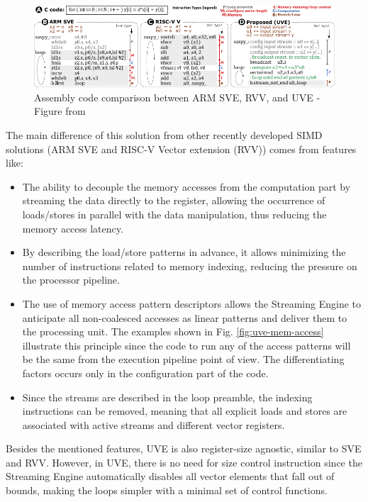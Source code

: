 \begin{figure}[H]
    \centering
    \includegraphics[width=.9\linewidth]{images/UVE-Comparison.pdf}
    \caption{Assembly code comparison between ARM SVE, RVV, and UVE - Figure from \cite{uve-paper}}
    \label{fig:uve-comparison}
\end{figure}

The main difference of this solution from other recently developed SIMD solutions (ARM SVE and RISC-V Vector extension (RVV)) comes from features like:
\begin{itemize}
\item[]   The ability to decouple the memory accesses from the computation part by streaming the data directly to the register, allowing the occurrence of loads/stores in parallel with the data manipulation, thus reducing the memory access latency.


\item[]   By describing the load/store patterns in advance, it allows minimizing the number of instructions related to memory indexing, reducing the pressure on the processor pipeline. 



\item[]   The use of memory access pattern descriptors allows the Streaming Engine to anticipate all non-coalesced accesses as linear patterns and deliver them to the processing unit. The examples shown in Fig. \ref{fig:uve-mem-access} illustrate this principle since the code to run any of the access patterns will be the same from the execution pipeline point of view. The differentiating factors occurs only in the configuration part of the code.


\item[]   Since the streams are described in the loop preamble, the indexing instructions can be removed, meaning that all explicit loads and stores are associated with active streams and different vector registers.
\end{itemize}

Besides the mentioned features, UVE is also register-size agnostic, similar to SVE and RVV. However, in UVE, there is no need for size control instruction since the Streaming Engine automatically disables all vector elements that fall out of bounds, making the loops simpler with a minimal set of control functions.


